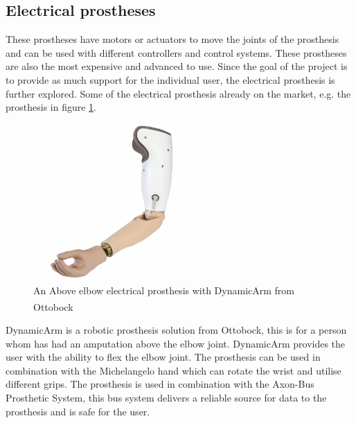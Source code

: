 \subsection*{Electrical prostheses}
These prostheses have motors or actuators to move the joints of the prosthesis and can be used with different controllers and control systems. These prostheses are also the most expensive and advanced to use. Since the goal of the project is to provide as much support for the individual user, the electrical prosthesis is further explored. Some of the electrical prosthesis already on the market, e.g. the prosthesis in figure \ref{fig:DynaArm}.   
\begin{figure}[H]
    \centering
    \includegraphics[width=6cm,height=6cm]{Figures/Contextual_figures/ProsthesesPics/dynamixarm.PNG}
    \caption{An Above elbow electrical prosthesis with DynamicArm from Ottobock\textsuperscript{\textcopyright} \cite{OttobockAB}}
    \label{fig:DynaArm}
\end{figure}
DynamicArm is a robotic prosthesis solution from Ottobock, this is for a person whom has had an amputation above the elbow joint. DynamicArm provides the user with the ability to flex the elbow joint\cite{OttobockAB}. The prosthesis can be used in combination with the Michelangelo hand which can rotate the wrist and utilise different grips\cite{OttobockM}. The prosthesis is used in combination with the Axon-Bus Prosthetic System, this bus system delivers a reliable source for data to the prosthesis and is safe for the user\cite{OttobockAX}.\\

